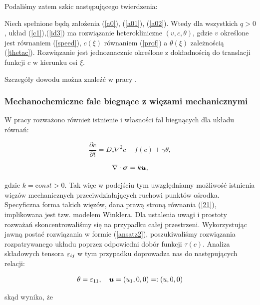 \medskip 

\noindent Podaliśmy zatem szkic następującego twierdzenia: 

\begin{thm} 
	Niech spełnione będą założenia (\ref{a0}), (\ref{a01}), (\ref{a02}). Wtedy	dla wszystkich $q>0$, układ (\ref{c1}),(\ref{id3}) ma rozwiązanie heterokliniczne $(v,c,\theta)$, gdzie $v$ określone jest równaniem (\ref{speed}), $c(\xi)$ równaniem (\ref{prof}) a $\theta(\xi)$ zależnością (\ref{thetac}). Rozwiązanie jest jednoznacznie określone z dokładnością do translacji funkcji $c$ w kierunku osi $\xi$. \B
\end{thm}

\noindent Szczegóły dowodu można znaleźć w pracy \cite{Kazmierczak2010}.

\medskip 

\subsubsection{Mechanochemiczne fale biegnące z więzami mechanicznymi}

\medskip 

W pracy \cite{Kazmierczak2011} rozważono również istnienie i własności fal biegnących dla układu równań: 

\begin{equation} \label{11}
\frac{\partial c}{\partial t} = D_c \nabla^2 c + 
f(c) + \gamma \theta, 
\end{equation}

\begin{equation} \label{21} \nabla \cdot {\mbox{\boldmath$\sigma$}} = k {\boldsymbol u},
\end{equation}

\noindent gdzie $k = {\mathrm const}>0$. Tak więc w podejściu tym uwzględniamy możliwość istnienia więzów mechanicznych przeciwdziałających ruchowi punktów ośrodka. Specyficzna forma takich więzów, dana prawą stroną równania (\ref{21}), implikowana jest tzw. modelem Winklera. Dla ustalenia uwagi i prostoty rozważań skoncentrowaliśmy się na przypadku całej przestrzeni. Wykorzystując jawną postać rozwiązania w formie (\ref{ansatz2}), poszukiwaliśmy rozwiązania rozpatrywanego układu poprzez odpowiedni dobór funkcji $\tau(c)$. Analiza składowych tensora $\varepsilon_{ij}$ w tym przypadku doprowadza nas do następujących relacji: 

\[ \theta=\varepsilon_{11}, \quad {\boldsymbol u} = (u_1,0,0)=:(u,0,0) \]

\noindent skąd wynika, że 

